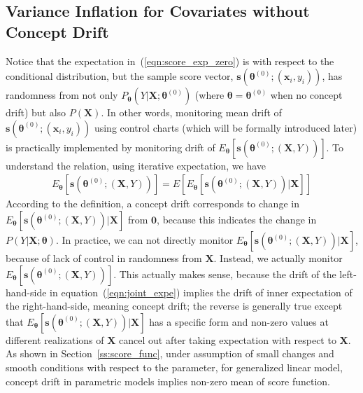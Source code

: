 \documentclass[twoside,11pt]{article}
\begin{document}
\subsection{Variance Inflation for Covariates without Concept Drift}
\label{ss:var_infla}
{Notice that the expectation in~(\ref{eqn:score_exp_zero}) is with respect to the conditional distribution, but the sample score vector, {$\bm{s} (\bm { \theta} ^{ (0)};(\bm {x}_i, y_i))$}, has randomness from not only $P_{\bm {\theta}} (Y|\bm {X};\bm{\theta}^{(0)})$ (where $\bm { \theta} = \bm { \theta}^{(0)}$ when no concept drift) but also $P (\bm {X})$. In other words, monitoring mean {drift} of {$\bm{s} (\bm { \theta}^{ (0)};(\bm {x}_i, y_i))$} using control charts (which will be formally introduced later) is practically implemented by monitoring drift of {$E _{ \bm { \theta}}[\bm{s} (\bm { \theta}^{ (0)};(\bm {X}, Y))]$}.
To understand the relation, using iterative expectation, we have}
\begin{align}
E_{ \bm { \theta} }[\bm{s} (\bm { \theta} ^{ (0)};(\bm {X}, Y))] = E [E _{ \bm { \theta} }[\bm{s} (\bm { \theta} ^{ (0)};(\bm {X}, Y))|\bm {X}]]
\label{eqn:joint_expe}
\end{align}
{According to the definition, a concept drift corresponds to change in $E _{ \bm { \theta} }[\bm{s} (\bm { \theta} ^{ (0)};(\bm {X}, Y))| \bm {X}]$ from $\bm{0}$, because this indicates the change in $P(Y|\bm {X};\bm{\theta})$. In practice, we can not directly monitor $E _{ \bm { \theta} }[\bm{s} (\bm { \theta} ^{ (0)};(\bm {X}, Y))| \bm {X}]$, because of lack of control in randomness from $\bm {X}$. Instead, we actually monitor $E_{ \bm { \theta} }[\bm{s} (\bm { \theta} ^{ (0)};(\bm {X}, Y))]$. This actually makes sense, because the {drift} of the left-hand-side in equation~(\ref{eqn:joint_expe}) implies the {drift} of inner expectation of the right-hand-side, meaning concept drift; the reverse is generally true except that {$E _{ \bm { \theta} }[\bm{s} (\bm { \theta} ^{ (0)};(\bm {X}, Y))| \bm {X}]$} has a specific form and non-zero values at different realizations of $\bm {X}$ cancel out after taking expectation with respect to $\bm {X}$. As shown in Section~\ref{ss:score_func}, under assumption of small changes and smooth conditions with respect to the parameter, for generalized linear model, concept drift in parametric models implies non-zero mean of score function.}
\end{document}
